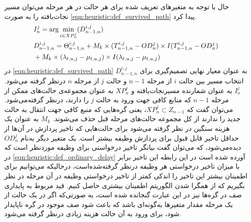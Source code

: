 حال با توجه به متغیرهای تعریف شده برای هر حالت در هر مرحله می‌توان مسیر نجات‌یافته را به صورت \cref{eqn:heuristic:def_survived_path} پیدا کرد. 
\begin{align}\label{eqn:heuristic:def_survived_path}
	&I_n^j = \arg \min_{i \in XP_n^j} (D_{n-1,n}^{i,j}) \\
	&D_{n-1,n}^{i,j} = \Theta_{n-1,n}^{i,j} + M_k \times (T_{n-1,n}^{i,j} - OD_n^j) \times I(T_{n-1,n}^{i,j} - OD_n^j) \notag \\
	&+M_k \times (\lambda_{t,u,j} - \mu_{t,u,j}) \times I(\lambda_{t,u,j} - \mu_{t,u,j})
\end{align}	
در \cref{eqn:heuristic:def_survived_path} $D_{n-1,n}^{i,j}$ به عنوان معیار نهایی تصمیم‌گیری برای انتخاب مسیر بین حالت $i$ از مرحله $n-1$ و حالت $j$ از مرحله $n$ درنظر گرفته می‌شود. $I_n^j$ به عنوان شمارنده مسیرنجات‌یافته و $XP_n^j$ به عنوان مجموعه‌ی حالت‌های ممکن از مرحله $n-1$ که منابع کافی جهت ورود به حالت $j$ را دارند، درنظر گرفته‌می‌شود. می‌توان گفت که $XP_n^j \subset Z_{n-1}$، یعنی گره‌هایی که منبع کافی جهت انتقال به حالت جدید را ندارند از کل مجموعه حالت‌های مرحله قبل حذف می‌شوند. $M_k$ به عنوان یک هزینه سنگین در نظر گرفته می‌شود برای حالت‌هایی که تاخیر پردازش در آن‌ها از حداقل تاخیر قابل قبول برای پردازش وظیفه بیشتر است. یک متغیر دیگر به‌نام $OD_n^j$ دیده‌می‌شود، که می‌توان گفت بیانگر تاخیر درخواستی برای وظیفه موردنظر است که در \cref{eqn:heuristic:def_ordinary_delay} آورده شده است در این رابطه این تاخیر برابر با میزان تاخیر درخواستی هر وظیفه درنظر گرفته‌شده‌است، درحالیکه می‌توانیم برای اطمینان بیشتر این تاخیر را اندکی کمتر از تاخیر درخواستی وظیفه در آن مرحله در نظر بگیریم که از همگرا شدن الگوریتم اطمینان بیشتری حاصل کنیم. قید مربوط به پایداری صف در گره‌ها نیز در این عبارت گنجانده شده است، به صورتی‌که اگر در یک حالت از یک مرحله مقدار متغیرها به‌گونه‌ای باشد که باعث شود صف موجود در گره ناپایدار شود، برای ورود به آن حالت هزینه زیادی درنظر گرفته می‌شود.

